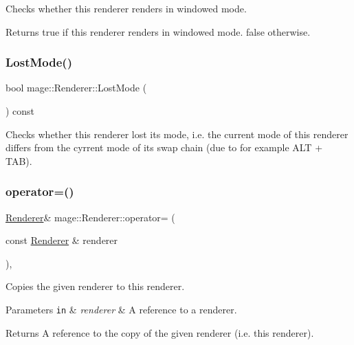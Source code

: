 Checks whether this renderer renders in windowed mode.

\begin{DoxyReturn}{Returns}
{\ttfamily true} if this renderer renders in windowed mode. {\ttfamily false} otherwise. 
\end{DoxyReturn}
\hypertarget{classmage_1_1_renderer_afdde83a1e2bc9288f000fb2575c525d0}{}\label{classmage_1_1_renderer_afdde83a1e2bc9288f000fb2575c525d0} 
\subsubsection{\texorpdfstring{Lost\+Mode()}{LostMode()}}
{\footnotesize\ttfamily bool mage\+::\+Renderer\+::\+Lost\+Mode (\begin{DoxyParamCaption}{ }\end{DoxyParamCaption}) const}

Checks whether this renderer lost its mode, i.\+e. the current mode of this renderer differs from the cyrrent mode of its swap chain (due to for example A\+LT + T\+AB). \hypertarget{classmage_1_1_renderer_a2762ead5f771ae95e4293cd7eb1a2834}{}\label{classmage_1_1_renderer_a2762ead5f771ae95e4293cd7eb1a2834} 
\subsubsection{\texorpdfstring{operator=()}{operator=()}}
{\footnotesize\ttfamily \hyperlink{classmage_1_1_renderer}{Renderer}\& mage\+::\+Renderer\+::operator= (\begin{DoxyParamCaption}\item[{const \hyperlink{classmage_1_1_renderer}{Renderer} \&}]{renderer }\end{DoxyParamCaption})\hspace{0.3cm}{\ttfamily [private]}, {\ttfamily [delete]}}

Copies the given renderer to this renderer.


\begin{DoxyParams}[1]{Parameters}
\mbox{\tt in}  & {\em renderer} & A reference to a renderer. \\
\hline
\end{DoxyParams}
\begin{DoxyReturn}{Returns}
A reference to the copy of the given renderer (i.\+e. this renderer). 
\end{DoxyReturn}
\hypertarget{classmage_1_1_renderer_a95a34b64e815b0e5e95ce539bbd0f5a3}{}\label{classmage_1_1_renderer_a95a34b64e815b0e5e95ce539bbd0f5a3} 
